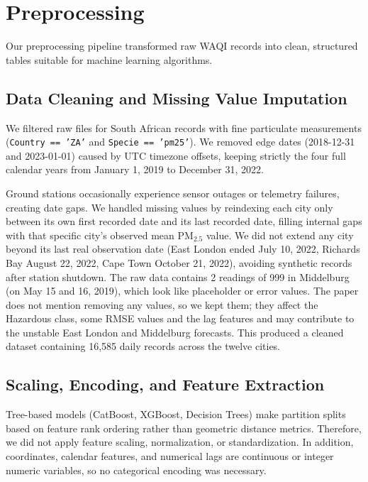 \section{Preprocessing}
Our preprocessing pipeline transformed raw WAQI records into clean, structured tables suitable for machine learning algorithms.

\subsection{Data Cleaning and Missing Value Imputation}
We filtered raw files for South African records with fine particulate measurements (\texttt{Country == 'ZA'} and \texttt{Specie == 'pm25'}). We removed edge dates (2018-12-31 and 2023-01-01) caused by UTC timezone offsets, keeping strictly the four full calendar years from January 1, 2019 to December 31, 2022.

Ground stations occasionally experience sensor outages or telemetry failures, creating date gaps. We handled missing values by reindexing each city only between its own first recorded date and its last recorded date, filling internal gaps with that specific city's observed mean $\text{PM}_{2.5}$ value. We did not extend any city beyond its last real observation date (East London ended July 10, 2022, Richards Bay August 22, 2022, Cape Town October 21, 2022), avoiding synthetic records after station shutdown. The raw data contains 2 readings of 999 in Middelburg (on May 15 and 16, 2019), which look like placeholder or error values. The paper does not mention removing any values, so we kept them; they affect the Hazardous class, some RMSE values and the lag features and may contribute to the unstable East London and Middelburg forecasts. This produced a cleaned dataset containing 16,585 daily records across the twelve cities.

\subsection{Scaling, Encoding, and Feature Extraction}
Tree-based models (CatBoost, XGBoost, Decision Trees) make partition splits based on feature rank ordering rather than geometric distance metrics. Therefore, we did not apply feature scaling, normalization, or standardization. In addition, coordinates, calendar features, and numerical lags are continuous or integer numeric variables, so no categorical encoding was necessary.


